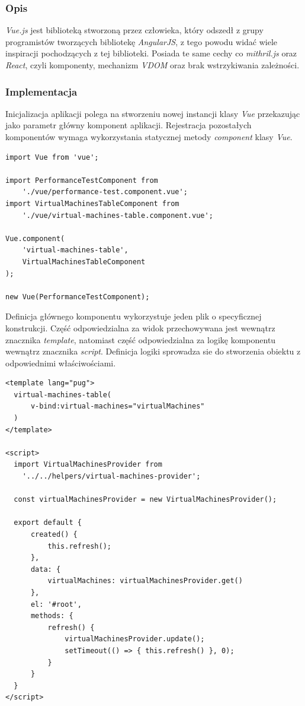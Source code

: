 \documentclass[polish, twoside, 12pt]{mwart}
\begin{document}
\subsubsection{Opis}

\emph{Vue.js} \cite{vue.js} jest biblioteką stworzoną przez człowieka, który odszedł z grupy programistów tworzących bibliotekę \emph{AngularJS}, z tego powodu widać wiele inspiracji pochodzących z tej biblioteki.
Posiada te same cechy co \emph{mithril.js} oraz \emph{React}, czyli komponenty, mechanizm \emph{VDOM} oraz brak wstrzykiwania zależności.

\subsubsection{Implementacja}

Inicjalizacja aplikacji polega na stworzeniu nowej instancji klasy \emph{Vue} przekazując jako parametr główny komponent aplikacji. Rejestracja pozostałych komponentów wymaga wykorzystania statycznej metody \emph{component} klasy \emph{Vue}.

\begin{lstlisting}[caption=Inicjalizacja głównego komponentu]
import Vue from 'vue';

import PerformanceTestComponent from
    './vue/performance-test.component.vue';
import VirtualMachinesTableComponent from
    './vue/virtual-machines-table.component.vue';

Vue.component(
    'virtual-machines-table',
    VirtualMachinesTableComponent
);

new Vue(PerformanceTestComponent);
\end{lstlisting}

Definicja głównego komponentu wykorzystuje jeden plik o specyficznej konstrukcji. Część odpowiedzialna za widok przechowywana jest wewnątrz znacznika \emph{template}, natomiast część odpowiedzialna za logikę komponentu wewnątrz znacznika \emph{script}. Definicja logiki sprowadza sie do stworzenia obiektu z odpowiednimi właściwościami.

\begin{lstlisting}[caption=Główny komponent]
<template lang="pug">
  virtual-machines-table(
      v-bind:virtual-machines="virtualMachines"
  )
</template>

<script>
  import VirtualMachinesProvider from
    '../../helpers/virtual-machines-provider';

  const virtualMachinesProvider = new VirtualMachinesProvider();

  export default {
      created() {
          this.refresh();
      },
      data: {
          virtualMachines: virtualMachinesProvider.get()
      },
      el: '#root',
      methods: {
          refresh() {
              virtualMachinesProvider.update();
              setTimeout(() => { this.refresh() }, 0);
          }
      }
  }
</script>
\end{lstlisting}
\end{document}
